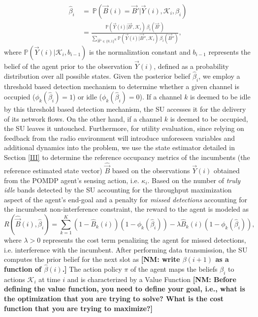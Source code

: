 \documentclass[10pt,twocolumn]{IEEEtran}
\newcommand{\nm}[1]{{\color{blue}\bf{[NM: #1]}}}
\begin{document}
\begin{align}\label{11}
\hat\beta_i\ &=\ \mathbb{P}(\vec{B}(i)=\vec{B}'|\vec{Y}(i),\mathcal K_i, \beta_i)\\&=
\nonumber
\frac{\mathbb{P}(\vec{Y}(i)|\vec{B}',\mathcal{K}_i)\ \beta_i(\vec{B}')}{
\sum_{\vec{B}''\in\{0,1\}^K}\mathbb{P}(\vec{Y}(i)|\vec{B}'',\mathcal{K}_i)\ \beta_i(\vec{B}'')},
\end{align}
where $\mathbb{P}(\vec{Y}(i)|\mathcal{K}_i,b_{i-1})$ is the normalization constant and $b_{i-1}$ represents the belief of the agent prior to the observation $\vec{Y}(i)$, defined as a probability distribution over all possible states.
Given the posterior belief $\hat{\beta}_i$, we employ a threshold based detection mechanism to determine whether a given channel is occupied ($\phi_k(\hat{\beta}_i) = 1$) or idle ($\phi_k(\hat{\beta}_i) = 0$). If a channel $k$ is deemed to be idle by this threshold based detection mechanism, the SU accesses it for the delivery of its network flows. On the other hand, if a channel $k$ is deemed to be occupied, the SU leaves it untouched. Furthermore, for utility evaluation, since relying on feedback from the radio environment will introduce unforeseen variables and additional dynamics into the problem, we use the state estimator detailed in Section \ref{III} to determine the reference occupancy metrics of the incumbents (the reference estimated state vector) $\hat{\vec{B}}$ based on the observations $\vec{Y}(i)$ obtained from the POMDP agent's sensing action, i.e. $\kappa_i$. Based on the number of \emph{truly idle} bands detected by the SU accounting for the throughput maximization aspect of the agent's end-goal and a penalty for \emph{missed detections} accounting for the incumbent non-interference constraint, the reward to the agent is modeled as
\begin{equation}\label{12}
    R(\hat{\vec{B}}(i), \hat{\beta}_i) = \sum_{k=1}^{K}(1 - \hat{B}_k(i))(1-\phi_k(\hat{\beta}_{i})) - \lambda \hat{B}_k(i)(1 - \phi_k(\hat{\beta}_i)),
\end{equation}
where $\lambda > 0$ represents the cost term penalizing the agent for missed detections, i.e. interference with the incumbent. After performing data transmission, the SU computes the prior belief for the next slot as
\nm{write $\beta(i+1)$ as a function of $\hat\beta(i)$.}
The action policy $\pi$ of the agent maps the beliefs $\beta_i$ to actions $\mathcal{K}_i$ at time $i$ and is characterized by a Value Function
\nm{Before defining the value function, you need to define your goal, i.e., what is the optimization that you are trying to solve? What is the cost function that you are trying to maximize?}
\end{document}
